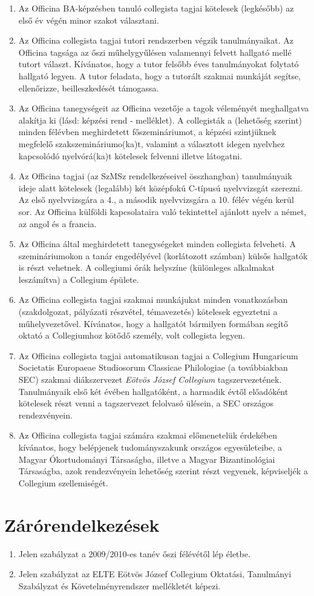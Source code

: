 \documentclass{../styles/rulebook}
\begin{document}
\begin{enumerate}
	\item Az Officina BA-képzésben tanuló collegista tagjai kötelesek (legkésőbb) az első év végén minor szakot választani.
	\item Az Officina collegista tagjai tutori rendszerben végzik tanulmányaikat. Az Officina tagsága az őszi műhelygyűlésen valamennyi felvett hallgató mellé tutort választ. Kívánatos, hogy a tutor felsőbb éves tanulmányokat folytató hallgató legyen. A tutor feladata, hogy a tutorált szakmai munkáját segítse, ellenőrizze, beilleszkedését támogassa.
	\item Az Officina tanegységeit az Officina vezetője a tagok véleményét meghallgatva alakítja ki (lásd: képzési rend - melléklet). A collegisták a (lehetőség szerint) minden félévben meghirdetett főszemináriumot, a képzési szintjüknek megfelelő szakszemináriumo(ka)t, valamint a választott idegen nyelvhez kapcsolódó nyelvórá(ka)t kötelesek felvenni illetve látogatni.
	\item Az Officina tagjai (az SzMSz rendelkezéseivel összhangban) tanulmányaik ideje alatt kötelesek (legalább) két középfokú C-típusú nyelvvizsgát szerezni. Az első nyelvvizsgára a 4., a második nyelvvizsgára a 10. félév végén kerül sor. Az Officina külföldi kapcsolataira való tekintettel ajánlott nyelv a német, az angol és a francia.
	\item Az Officina által meghirdetett tanegységeket minden collegista felveheti. A szemináriumokon a tanár engedélyével (korlátozott számban) külsős hallgatók is részt vehetnek. A collegiumi órák helyszíne (különleges alkalmakat leszámítva) a Collegium épülete.
	\item Az Officina collegista tagjai szakmai munkájukat minden vonatkozásban (szakdolgozat, pályázati részvétel, témavezetés) kötelesek egyeztetni a műhelyvezetővel. Kívánatos, hogy a hallgatót bármilyen formában segítő oktató a Collegiumhoz kötődő személy, volt collegista legyen.
	\item Az Officina collegista tagjai automatikusan tagjai a Collegium Hungaricum Societatis Europaeae Studiosorum Classicae Philologiae (a továbbiakban SEC) szakmai diákszervezet \emph{Eötvös József Collegium} tagszervezetének. Tanulmányaik első két évében hallgatóként, a harmadik évtől előadóként kötelesek részt venni a tagszervezet felolvasó ülésein, a SEC országos rendezvényein.
	\item Az Officina collegista tagjai számára szakmai előmenetelük érdekében kívánatos, hogy belépjenek tudományszakunk országos egyesületeibe, a Magyar Ókortudományi Társaságba, illetve a Magyar Bizantinológiai Társaságba, azok rendezvényein lehetőség szerint részt vegyenek, képviseljék a Collegium szellemiségét.
\end{enumerate}


\section{Zárórendelkezések}

\begin{enumerate}
	\item Jelen szabályzat a 2009/2010-es tanév őszi félévétől lép életbe.
	\item Jelen szabályzat az ELTE Eötvös József Collegium Oktatási, Tanulmányi Szabályzat és Követelményrendszer mellékletét képezi.
\end{enumerate}
\end{document}
